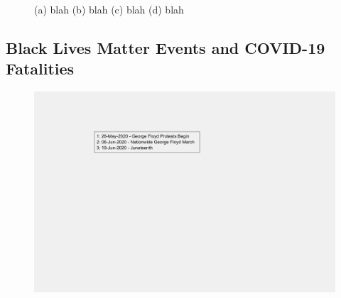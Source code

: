 \documentclass[]{article}
\begin{document}
\begin{figure}
	\caption{(a) blah (b) blah (c) blah (d) blah}
	\label{fig:foobar}
\end{figure}
\FloatBarrier
\vspace{5mm}

\subsection{Black Lives Matter Events and COVID-19 Fatalities}

\begin{figure}[!h]
	\includegraphics[width=\linewidth]{legends/BLM_legend.png}
	\caption{}
	\label{fig:legends/BLM_legendLabel}
\end{figure}
\end{document}
